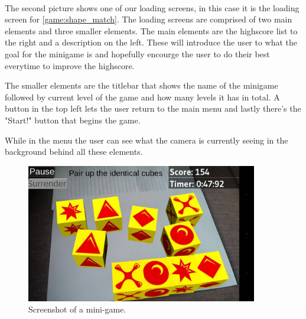 \paragraph{}
The second picture shows one of our loading screens, in this case it is the loading screen for {}\ref{game:shape_match}.
The loading screens are comprised of two main elements and three smaller elements.
The main elements are the highscore list to the right and a description on the left.
These will introduce the user to what the goal for the minigame is and hopefully encourge the user to do their best everytime to improve the highscore.

The smaller elements are the titlebar that shows the name of the minigame followed by current level of the game and how many levels it has in total.
A button in the top left lets the user return to the main menu and lastly there's the "Start!" button that begins the game.

While in the menu the user can see what the camera is currently seeing in the background behind all these elements.

\begin{figure}[h]
	\centering
	\begin{minipage}{.5\textwidth}
		\capstart
		\centering
		\includegraphics[width=0.9\textwidth]{images/match_cubes.jpg}
		\vspace{-10pt}
		\caption{Screenshot of a mini-game.}
		\label{fig:screenshot_mini-game}
	\end{minipage}
\end{figure}

